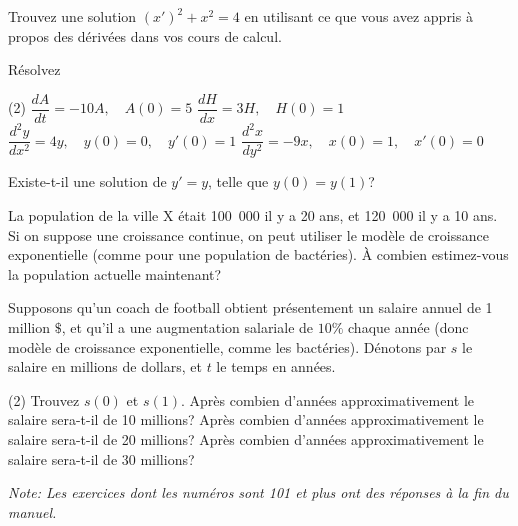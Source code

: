 \begin{exercise}
	Trouvez une solution
	${(x')}^2 + x^2 = 4$
	en utilisant ce que vous avez appris à propos des dérivées dans vos cours de calcul.
\end{exercise}

\begin{exercise}
	Résolvez
	\begin{tasks}(2)
		\task $\dfrac{dA}{dt} = -10 A, \quad A(0)=5$
		\task $\dfrac{dH}{dx} = 3 H, \quad H(0)=1$
		\task $\dfrac{d^2y}{dx^2} = 4 y, \quad y(0)=0, \quad y'(0)=1$
		\task $\dfrac{d^2x}{dy^2} = -9 x, \quad x(0)=1, \quad x'(0)=0$
	\end{tasks}
\end{exercise}

\begin{exercise}
	Existe-t-il une solution de $y' = y$, telle que $y(0) = y(1)$?
\end{exercise}

\begin{exercise}
	La population de la ville X était 100~000 il y a 20 ans, et 120~000 il y a 10 ans.  
	Si on suppose une croissance continue, on peut utiliser le modèle de croissance exponentielle
	(comme pour une population de bactéries). À combien estimez-vous la population actuelle maintenant?
\end{exercise}

\begin{exercise}
	Supposons qu'un coach de football obtient présentement un salaire annuel de 1 million $\$$,
	et qu'il a une augmentation salariale de $10\%$ chaque année (donc modèle de croissance exponentielle, comme les bactéries).
	Dénotons par $s$ le salaire en millions de dollars, et $t$ le temps en années.
	\begin{tasks}(2)
	\task Trouvez $s(0)$ et $s(1)$.
	\task Après combien d'années approximativement le salaire sera-t-il de 10 millions?
	\task Après combien d'années approximativement le salaire sera-t-il de 20 millions?
	\task Après combien d'années approximativement le salaire sera-t-il de 30 millions?
	\end{tasks}
\end{exercise}


\noindent
\emph{Note: Les exercices dont les numéros sont 101 et plus ont des réponses à la fin du manuel.}


\setcounter{exercise}{100}

